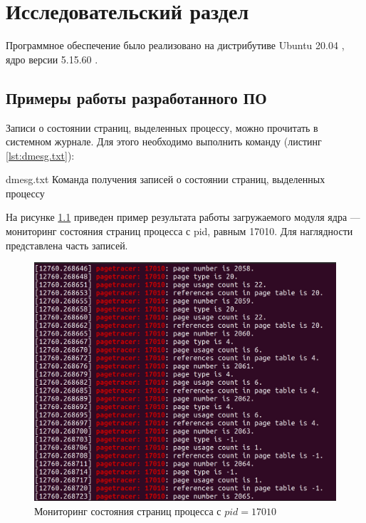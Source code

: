 \chapter{Исследовательский раздел}

Программное обеспечение было реализовано на дистрибутиве Ubuntu 20.04 \cite{ubuntu}, ядро версии 5.15.60 \cite{kernel}.

\section{Примеры работы разработанного ПО}

Записи о состоянии страниц, выделенных процессу, можно прочитать в системном журнале. Для этого необходимо выполнить команду (листинг \ref{lst:dmesg.txt}):

    {dmesg.txt}
    {Команда получения записей о состоянии страниц, выделенных процессу}
    
На рисунке \ref{img:example1} приведен пример результата работы загружаемого модуля ядра --- мониторинг состояния страниц процесса с pid, равным 17010. Для наглядности представлена часть записей.

\begin{figure}[H]
	\begin{center}
		\includegraphics[scale=0.45]{inc/img/example1.png}
	\end{center}
	\captionsetup{justification=centering}
	\caption{Мониторинг состояния страниц процесса с $pid = 17010$}
	\label{img:example1}
\end{figure}

